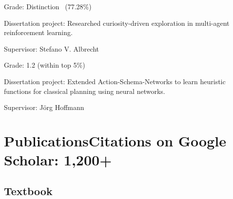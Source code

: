 \documentclass[a4paper,12pt]{article}
\begin{document}
\begin{expblock}
    \begin{explist}
	\item Grade: Distinction \ (77.28\%)
	\item Dissertation project: Researched curiosity-driven exploration in multi-agent reinforcement learning.
	\item Supervisor: Stefano V. Albrecht
    \end{explist}
\end{expblock}

\begin{expblock}
    \begin{explist}
	\item Grade: 1.2 (within top 5\%)
	\item Dissertation project: Extended Action-Schema-Networks to learn heuristic functions for classical planning using neural networks.
	\item Supervisor: J\"org Hoffmann
    \end{explist}
\end{expblock}

\section{Publications\hfill {\large Citations on Google Scholar: 1,200+}}

\subsection{Textbook}
\printbibliography[heading=none, type=book, notkeyword=skip]
\end{document}

